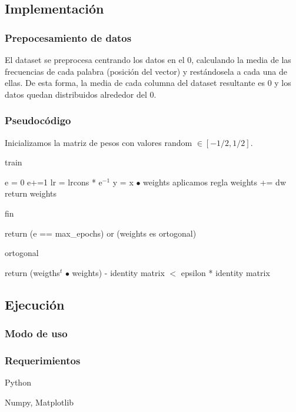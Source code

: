 \subsection{Implementación}

\subsubsection{Prepocesamiento de datos}

El dataset se preprocesa centrando los datos en el 0, calculando la media de las frecuencias de cada palabra (posición del vector) y restándosela a cada una de ellas. De esta forma, la media de cada columna del dataset resultante es 0 y los datos quedan distribuidos alrededor del 0.

\subsubsection{Pseudocódigo}

Inicializamos la matriz de pesos con valores random $\in[-1/2, 1/2]$.

\begin{algorithm}[H]
\caption{train}
\begin{algorithmic}
	\State e = 0
        \State e+=1
        \State lr = lrcons * e$^{-1}$
            \State y = x $\bullet$ weights
            \State aplicamos regla
            \State weights += dw
        \EndFor
    \EndWhile
    \State return weights
\end{algorithmic}
\end{algorithm}

\begin{algorithm}[H]
\caption{fin}
\begin{algorithmic}
	\State return (e == max\_epochs) or (weights es ortogonal)
\end{algorithmic}
\end{algorithm}

\begin{algorithm}[H]
\caption{ortogonal}
\begin{algorithmic}
	\State return (weigths$^t$ $\bullet$ weights) - identity matrix $<$ epsilon * identity matrix
\end{algorithmic}
\end{algorithm}


\subsection{Ejecución}

\subsubsection{Modo de uso}

\subsubsection{Requerimientos}

Python

Numpy, Matplotlib